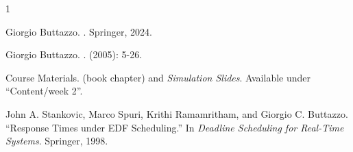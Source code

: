\documentclass[a4paper,11pt]{article}
\begin{document}

\begin{thebibliography}{1}

Giorgio Buttazzo.
.
\newblock Springer, 2024.

Giorgio Buttazzo.
.
\newblock (2005): 5-26.

Course Materials.
 (book chapter) and {\em Simulation Slides}.
\newblock Available under ``Content/week 2''.

John A. Stankovic, Marco Spuri, Krithi Ramamritham, and Giorgio C. Buttazzo.
\newblock ``Response Times under EDF Scheduling.''
\newblock In {\em Deadline Scheduling for Real-Time Systems}.
\newblock Springer, 1998.

\end{thebibliography}
\end{document}
